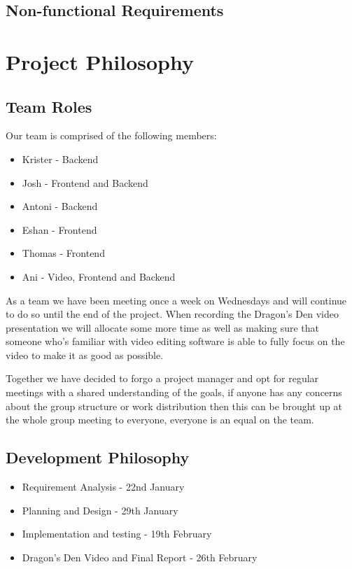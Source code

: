 \documentclass{article}
\begin{document}
\subsection{Non-functional Requirements}

\section{Project Philosophy}
\subsection{Team Roles}
Our team is comprised of the following members:

\begin{itemize}
  \item Krister - Backend 
  \item Josh - Frontend and Backend 
  \item Antoni - Backend 
  \item Eshan -  Frontend
  \item Thomas - Frontend
  \item Ani - Video, Frontend and Backend
\end{itemize}

As a team we have been meeting once a week on Wednesdays and will continue to do 
so until the end of the project. When recording the Dragon's Den video presentation 
we will allocate some more time as well as making sure that someone who's familiar 
with video editing software is able to fully focus on the video to make it as good
as possible. 

Together we have decided to forgo a project manager and opt for regular meetings 
with a shared understanding of the goals, if anyone has any concerns about the group 
structure or work distribution then this can be brought up at the whole group meeting 
to everyone, everyone is an equal on the team.

\subsection{Development Philosophy}
\begin{itemize}
  \item Requirement Analysis
        - 22nd January
  \item Planning and Design
        - 29th January
  \item Implementation and testing
        - 19th February
  \item Dragon's Den Video and Final Report
        - 26th February
\end{itemize}
\end{document}
